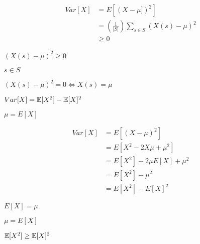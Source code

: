 \documentclass[10pt]{book}
\begin{document}
\begin{mdSnippets}
\begin{mdDisplaySnippet}
\[\begin{aligned}
Var[X] &= E[(X - \mu])^2] \\
&= \left(\frac{1}{|S|}\right) \sum_{s \in S} (X(s) - \mu)^2 \\
&\geq 0 
\end{aligned}
\]%
\end{mdDisplaySnippet}%
\begin{mdInlineSnippet}%
$(X(s) - \mu)^2 \geq 0$\end{mdInlineSnippet}%
\begin{mdInlineSnippet}[0718ed5a3e27d89dc5efb8160425a476]%
$s \in S$\end{mdInlineSnippet}%
\begin{mdInlineSnippet}[077c44791eb1d513cc0541f0898cd6e0]%
$(X(s) - \mu)^2 = 0 \iff X(s) = \mu$\end{mdInlineSnippet}%
\begin{mdInlineSnippet}[078c8c94fd558ba0bd3082bd99b2b7cb]%
$Var[X] = \mathbb{E}[X^2] - \mathbb{E}[X]^2$\end{mdInlineSnippet}%
\begin{mdInlineSnippet}%
$\mu = E[X]$\end{mdInlineSnippet}%
\begin{mdDisplaySnippet}[bb97ef94da410e27bccd50467af84c93]%
\[%
\begin{aligned}
Var[X] &= E[(X - \mu)^2] \\
&= E[X^2 - 2X\mu + \mu^2]  \\
&= E[X^2] - 2\mu E[X] + \mu^2 \\
&= E[X^2] - \mu^2 \\
&= E[X^2] - E[X]^2
\end{aligned}
\]%
\end{mdDisplaySnippet}%
\begin{mdInlineSnippet}[a1058e66f0dd841b499ff2d1eed10e33]%
$E[X] = \mu$\end{mdInlineSnippet}%
\begin{mdInlineSnippet}%
$\mu = E[X]$\end{mdInlineSnippet}%
\begin{mdInlineSnippet}[e568d1cb99f707e3b257e8d0f292e443]%
$\mathbb{E}[X^2] \geq \mathbb{E}[X]^2$\end{mdInlineSnippet}%

\end{mdSnippets}
\end{document}
